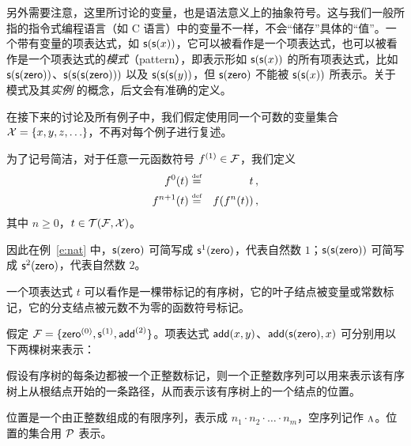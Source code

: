 另外需要注意，这里所讨论的变量，也是语法意义上的抽象符号。这与我们一般所指的指令式编程语言（如 C 语言）中的变量不一样，不会“储存”具体的“值”。一个带有变量的项表达式，如 $\s(\s(x))$，它可以被看作是一个项表达式，也可以被看作是一个项表达式的\emph{模式}（pattern），即表示形如 $\s(\s(x))$ 的所有项表达式，比如 $\s(\s(\zero))$、$\s(\s(\s(\zero)))$ 以及 $\s(\s(\s(y))$，但 $\s(\zero)$ 不能被 $\s(\s(x))$ 所表示。关于模式及其\emph{实例} 的概念，后文会有准确的定义。

在接下来的讨论及所有例子中，我们假定使用同一个可数的变量集合 $\cX=\{x,y,z,\ldots\}$，不再对每个例子进行复述。

为了记号简洁，对于任意一元函数符号 $f^{(1)}\in\cF$，我们定义
\begin{eqnarray}
    f^0(t) & \defeq & t \, ,     \nonumber \\
    f^{n+1}(t) & \defeq & f(f^n(t)) \, ,\nonumber 
\end{eqnarray}
其中 $n\ge 0$，$t\in\TFX$。

因此在例~\ref{e:nat} 中，$\s(\zero)$ 可简写成 $\s^1(\zero)$，代表自然数 $1$；$\s(\s(\zero))$ 可简写成 $\s^2(\zero)$，代表自然数 $2$。

一个项表达式 $t$ 可以看作是一棵带标记的有序树，它的叶子结点被变量或常数标记，它的分支结点被元数不为零的函数符号标记。

\begin{example}
\label{e:term-tree}
假定 $\cF = \{\zero^{(0)}, \s^{(1)}, \add^{(2)}\}$。项表达式 $\add(x,y)$、$\add(\s(\zero), x)$ 可分别用以下两棵树来表示：

\medskip
\centering
{}
\end{example}

假设有序树的每条边都被一个正整数标记，则一个正整数序列可以用来表示该有序树上从根结点开始的一条路径，从而表示该有序树上的一个结点的位置。

\begin{definition}[位置]
位置是一个由正整数组成的有限序列，表示成 $n_1\cdot n_2\cdot\ldots\cdot n_m$，空序列记作 $\rootp$。位置的集合用 $\cP$ 表示。
\end{definition}

